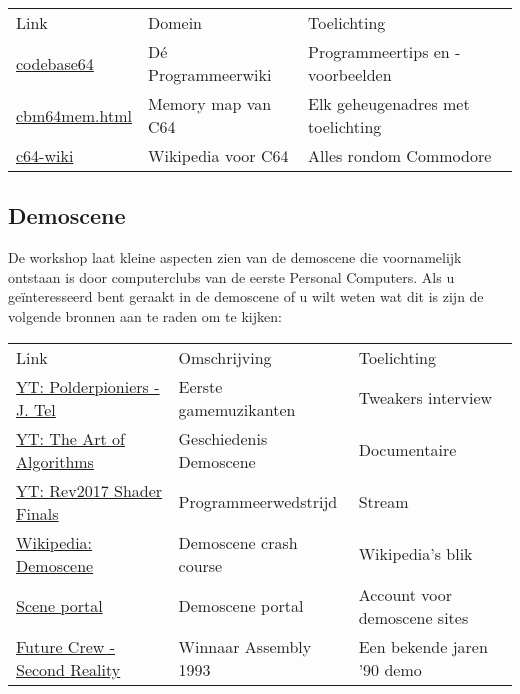 \documentclass{article}
\begin{document}
\begin{tabular}{l|l|l}
Link & Domein & Toelichting \\
\href{http://codebase64.org}{codebase64} & D\'e Programmeerwiki & Programmeertips en -voorbeelden \\
\href{http://sta.c64.org/cbm64mem.html}{cbm64mem.html} & Memory map van C64 & Elk geheugenadres met toelichting \\
\href{https://www.c64-wiki.com}{c64-wiki} & Wikipedia voor C64 & Alles rondom Commodore \\
\end{tabular}

\subsection{Demoscene}

De workshop laat kleine aspecten zien van de demoscene die voornamelijk ontstaan is door computerclubs van de eerste Personal Computers.
Als u ge\"interesseerd bent geraakt in de demoscene of u wilt weten wat dit is zijn de volgende bronnen aan te raden om te kijken:

\begin{tabular}{l|l|l}
Link & Omschrijving & Toelichting \\
\href{https://www.youtube.com/watch?v=AdTANxS-LHg}{YT: Polderpioniers - J. Tel} & Eerste gamemuzikanten & Tweakers interview \\
\href{https://www.youtube.com/watch?v=5MexnBunH_g}{YT: The Art of Algorithms} & Geschiedenis Demoscene & Documentaire \\
\href{https://www.youtube.com/watch?v=O-1zEo7DD8w}{YT: Rev2017 Shader Finals} & Programmeerwedstrijd & Stream \\
\href{https://en.wikipedia.org/wiki/Demoscene}{Wikipedia: Demoscene} & Demoscene crash course & Wikipedia's blik \\
\href{https://id.scene.org/}{Scene portal} & Demoscene portal & Account voor demoscene sites \\
\href{https://www.youtube.com/watch?v=rFv7mHTf0nA}{Future Crew - Second Reality} & Winnaar Assembly 1993 & Een bekende jaren '90 demo \\
\end{tabular}
\end{document}
